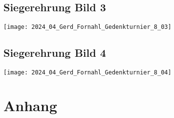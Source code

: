\documentclass[a4paper,ngerman]{tui-algo-seminar}
\begin{document}
\subsection{Siegerehrung Bild 3}
\begin{center}
    \texttt{[image: 2024\_04\_Gerd\_Fornahl\_Gedenkturnier\_8\_03]}
    \label{fig:gerd_fornahl_3}
\end{center}

\subsection{Siegerehrung Bild 4}
\begin{center}
    \texttt{[image: 2024\_04\_Gerd\_Fornahl\_Gedenkturnier\_8\_04]}
    \label{fig:gerd_fornahl_4}
\end{center}

\clearpage
\section{Anhang}

\end{document}
